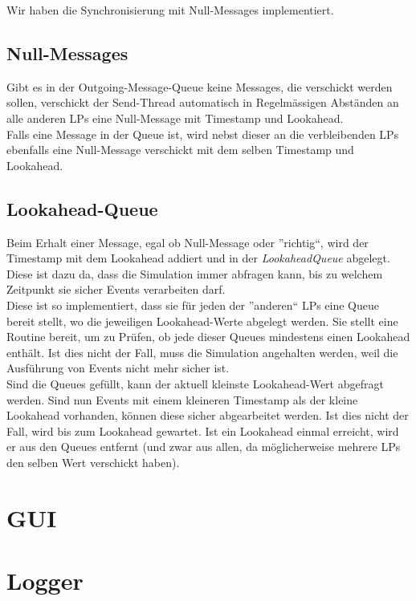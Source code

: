 \documentclass[oneside,DIV12,BCOR0.5cm,bibliography=totoc]{template}
\begin{document}
\begin{empfile}
Wir haben die Synchronisierung mit Null-Messages implementiert.

\subsection{Null-Messages}

Gibt es in der Outgoing-Message-Queue keine Messages, die verschickt
werden sollen, verschickt der Send-Thread automatisch in Regelmässigen
Abständen an alle anderen LPs eine Null-Message mit Timestamp und 
Lookahead.\\

Falls eine Message in der Queue ist, wird nebst dieser an die 
verbleibenden LPs ebenfalls eine Null-Message verschickt mit dem
selben Timestamp und Lookahead.

\subsection{Lookahead-Queue}

Beim Erhalt einer Message, egal ob Null-Message oder ''richtig``, wird
der Timestamp mit dem Lookahead addiert und in der \emph{LookaheadQueue}
abgelegt. Diese ist dazu da, dass die Simulation immer abfragen kann,
bis zu welchem Zeitpunkt sie sicher Events verarbeiten darf.\\

Diese ist so implementiert, dass sie für jeden der ''anderen`` LPs
eine Queue bereit stellt, wo die jeweiligen Lookahead-Werte abgelegt
werden. Sie stellt eine Routine bereit, um zu Prüfen, ob jede dieser
Queues mindestens einen Lookahead enthält. Ist dies nicht der Fall,
muss die Simulation angehalten werden, weil die Ausführung von Events
nicht mehr sicher ist.\\

Sind die Queues gefüllt, kann der aktuell kleinste Lookahead-Wert
abgefragt werden. Sind nun Events mit einem kleineren Timestamp als der
kleine Lookahead vorhanden, können diese sicher abgearbeitet werden. Ist
dies nicht der Fall, wird bis zum Lookahead gewartet. Ist ein Lookahead
einmal erreicht, wird er aus den Queues entfernt (und zwar aus allen,
da möglicherweise mehrere LPs den selben Wert verschickt haben).

\section{GUI}

\section{Logger}


\end{empfile}
\end{document}

